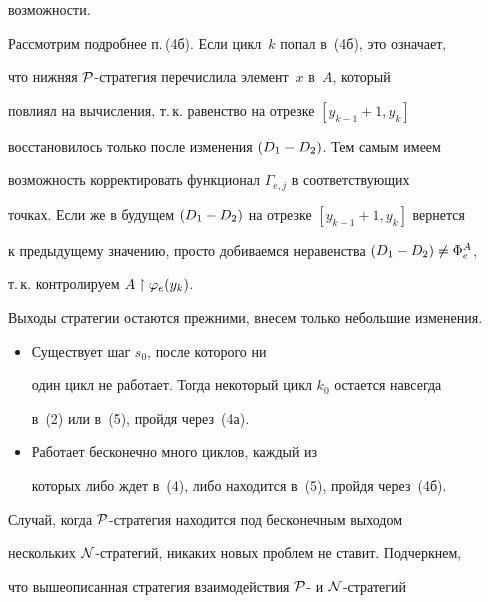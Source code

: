 возможности.





Рассмотрим подробнее п.\,(4б). Если цикл~$k$ попал в~(4б), это означает,


что нижняя $\cal P$-стратегия перечислила элемент~$x$ в~$A$, который


повлиял на вычисления, т.\,к. равенство на отрезке $[y_{k-1}+1,y_k]$


восстановилось только после изменения $\draz$. Тем самым имеем


возможность корректировать функционал $\Gamma_{e,j}$ в соответствующих


точках. Если же в будущем $\draz$ на отрезке $[y_{k-1}+1,y_k]$ вернется


к предыдущему значению, просто добиваемся неравенства $\draz\neq\Phi_e^A$,


т.\,к. контролируем $A\upharpoonright\varphi_e(y_k)$.





Выходы стратегии остаются прежними, внесем только небольшие изменения.


\begin{itemize}


\begin{itemize}


\item[\underline{Выход 1}.] Существует шаг $s_0$, после которого ни


один цикл не работает. Тогда некоторый цикл $k_0$ остается навсегда


в~(2) или в~(5), пройдя через~(4а).


\item[\underline{Выход 2}.] Работает бесконечно много циклов, каждый из


которых либо ждет в~(4), либо находится в~(5), пройдя через~(4б).


\end{itemize}


\end{itemize}





Случай, когда $\cal P$-стратегия находится под бесконечным выходом


нескольких $\cal N$-стратегий, никаких новых проблем не ставит. Подчеркнем,


что вышеописанная стратегия взаимодействия $\cal P$- и $\cal N$-стратегий


